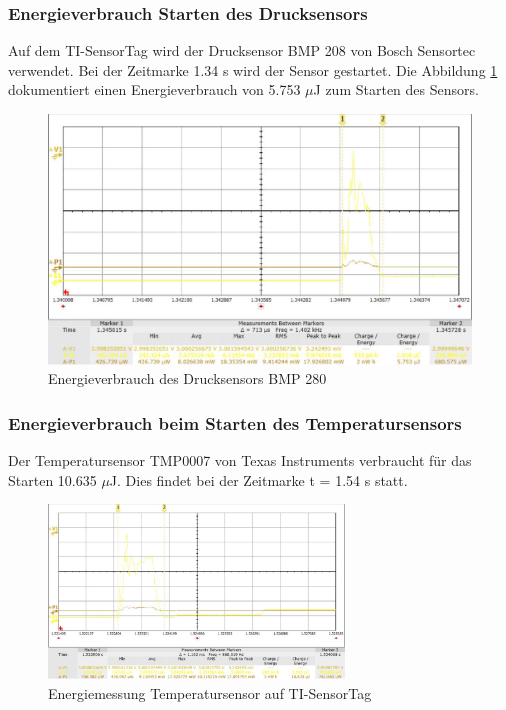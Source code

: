 \subsubsection*{Energieverbrauch Starten des Drucksensors}

Auf dem TI-SensorTag wird der Drucksensor BMP 208 von Bosch Sensortec verwendet. Bei der Zeitmarke 1.34 s wird der Sensor gestartet. Die Abbildung \ref{energie_drucksensor} dokumentiert einen Energieverbrauch von 5.753 $\mu$J zum Starten des Sensors.

\begin{figure}[ht]
  \includegraphics[width=1.0\textwidth]{3Vorgehen/imag/Drucksensor.png}
  \caption{Energieverbrauch des Drucksensors BMP 280}
  \label{energie_drucksensor}
\end{figure}

\clearpage

\subsubsection*{Energieverbrauch beim Starten des Temperatursensors}

Der Temperatursensor TMP0007 von Texas Instruments verbraucht für das Starten 10.635 $\mu$J. Dies findet bei der Zeitmarke t = 1.54 s statt.

\begin{figure}[ht]
  \includegraphics[width=0.7\textwidth]{3Vorgehen/imag/tempSensor.png}
  \caption{Energiemessung Temperatursensor auf TI-SensorTag}
  \label{energie_tempsensor}
\end{figure}


